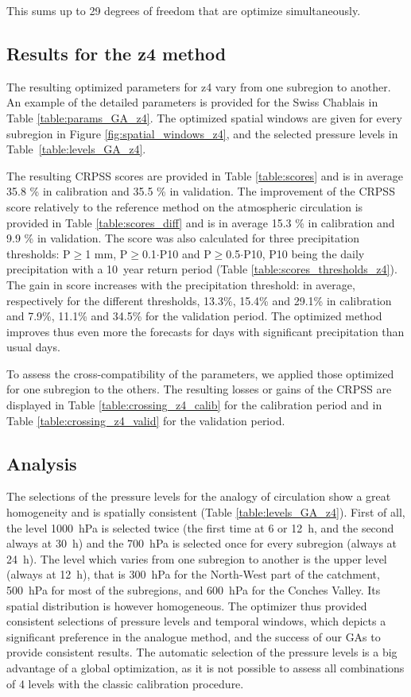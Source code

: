 \documentclass[twocol]{ametsoc}
\begin{document}
This sums up to 29 degrees of freedom that are optimize simultaneously.


\subsection{Results for the z4 method}

The resulting optimized parameters for z4 vary from one subregion to another. An example of the detailed parameters is provided for the Swiss Chablais in Table \ref{table:params_GA_z4}. The optimized spatial windows are given for every subregion in Figure \ref{fig:spatial_windows_z4}, and the selected pressure levels in Table~\ref{table:levels_GA_z4}. 

The resulting CRPSS scores are provided in Table \ref{table:scores} and is in average 35.8 \% in calibration and 35.5 \% in validation. The improvement of the CRPSS score relatively to the reference method on the atmospheric circulation is provided in Table \ref{table:scores_diff} and is in average 15.3 \% in calibration and 9.9 \% in validation. The score was also calculated for three precipitation thresholds: P\(\geq\)1 mm, P\(\geq\)0.1\(\cdot\)P10 and P\(\geq\)0.5\(\cdot\)P10, P10 being the daily precipitation with a 10~year return period (Table \ref{table:scores_thresholds_z4}). The gain in score increases with the precipitation threshold: in average, respectively for the different thresholds, 13.3\%, 15.4\% and 29.1\% in calibration and 7.9\%, 11.1\% and 34.5\% for the validation period. The optimized method improves thus even more the forecasts for days with significant precipitation than usual days.

To assess the cross-compatibility of the parameters, we applied those optimized for one subregion to the others. The resulting losses or gains of the CRPSS are displayed in Table \ref{table:crossing_z4_calib} for the calibration period and in Table \ref{table:crossing_z4_valid} for the validation period.


\subsection{Analysis}

The selections of the pressure levels for the analogy of circulation show a great homogeneity and is spatially consistent (Table \ref{table:levels_GA_z4}). First of all, the level 1000~hPa is selected twice (the first time at 6 or 12~h, and the second always at 30~h) and the 700~hPa is selected once for every subregion (always at 24~h). The level which varies from one subregion to another is the upper level (always at 12~h), that is 300~hPa for the North-West part of the catchment, 500~hPa for most of the subregions, and 600~hPa for the Conches Valley. Its spatial distribution is however homogeneous. The optimizer thus provided consistent selections of pressure levels and temporal windows, which depicts a significant preference in the analogue method, and the success of our GAs to provide consistent results. The automatic selection of the pressure levels is a big advantage of a global optimization, as it is not possible to assess all combinations of 4 levels with the classic calibration procedure.
\end{document}
